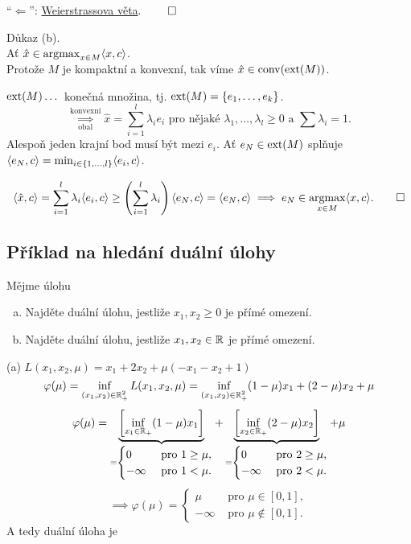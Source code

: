 \enquote{$\Leftarrow$}: \href{https://cs.wikipedia.org/wiki/Weierstrassova_v%C4%9Bta}{Weierstrassova věta}. $\qed$

Důkaz (b). \\ Ať $\hat x \in \operatorname*{argmax}_{x \in M} \langle x,c\rangle$. \\
Protože $M$ je kompaktní a konvexní, tak víme $\hat x \in \operatorname*{conv}(\operatorname*{ext}(M))$.

$\operatorname*{ext}(M) \dots$ konečná množina, tj. $\operatorname*{ext}(M) = \left\lbrace e_1, \dots, e_k \right\rbrace$.
\[
    \underset{\text{obal}}{\overset{\text{konvexní}}{\implies}} \hat x = \sum_{i=1}^{l} \lambda_i e_i \text{ pro nějaké }
    \lambda_1, \dots, \lambda_l \geq 0 \text{ a } \sum \lambda_i = 1.
\]
Alespoň jeden krajní bod musí být mezi $e_i$. 
Ať $e_N \in \operatorname*{ext}(M)$ splňuje $\langle e_N, c\rangle = \min_{i \in \left\lbrace 1, \dots, l \right\rbrace} \langle e_i, c\rangle$.

\[
    \langle \hat x, c\rangle = \sum_{i=1}^{l} \lambda_i \langle e_i, c\rangle \geq \left(\sum_{i=1}^{l} \lambda_i\right)
    \langle e_N, c\rangle = \langle e_N, c\rangle \implies e_N \in \operatorname*{argmax}_{x \in M} \langle x, c\rangle. \qed
\]

\subsection{Příklad na hledání duální úlohy}
Mějme úlohu
\begin{enumerate}[(a)]
    \item Najděte duální úlohu, jestliže $x_1, x_2 \geq 0$ je přímé omezení.
    \item Najděte duální úlohu, jestliže $x_1, x_2 \in \mathbb{R}$ je přímé omezení.
\end{enumerate}
(a) $L(x_1, x_2, \mu) = x_1 + 2x_2 + \mu(-x_1 -x_2 + 1)$
\[
    \varphi(\mu) = \inf_{(x_1, x_2) \in \mathbb{R}_+^2} L(x_1, x_2, \mu) = \inf_{(x_1, x_2) \in \mathbb{R}_+^2} (1-\mu)x_1 + 
    (2-\mu)x_2 + \mu
\]
\[
    \varphi(\mu) = \underbrace{\left[\inf_{x_1 \in \mathbb{R}_+} (1-\mu)x_1\right]}_{=
    \begin{cases}
        0 &\text{ pro } 1 \geq \mu, \\
        - \infty &\text{ pro } 1 < \mu.
    \end{cases}} + \underbrace{\left[\inf_{x_2 \in \mathbb{R}_+} (2-\mu)x_2\right]}_{=
    \begin{cases}
        0 &\text{ pro } 2 \geq \mu, \\
        - \infty &\text{ pro } 2 < \mu.
    \end{cases}} + \mu
\]
\[
    \implies \varphi(\mu) =
    \begin{cases}
        \mu &\text{ pro } \mu \in [0,1], \\
        -\infty &\text{ pro } \mu \not\in [0,1].
    \end{cases}
\]
A tedy duální úloha je

